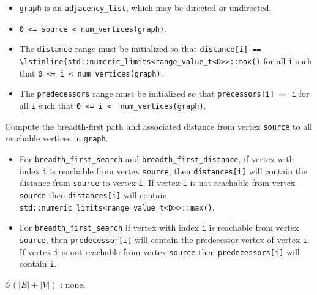 \begin{itemdescr}
      \pnum\preconditions
      \begin{itemize}
            \item
                  \lstinline{graph} is an \lstinline{adjacency_list}, which may be directed or
                  undirected.
            \item
                  \lstinline{0 <= source < num_vertices(graph)}.

            \item
                  The \lstinline{distance} range must be initialized so that
                  \lstinline{distance[i] == \lstinline{std::numeric_limits<range_value_t<D>>::max()}
                  for all \lstinline{i}
                  such that \lstinline{0 <= i < num_vertices(graph)}.  
            \item
                  The \lstinline{predecessors} range must be initialized so that
                  \lstinline{precessors[i] == i} for all \lstinline{i} such that
                  \lstinline{0 <= i <  num_vertices(graph)}.
      \end{itemize}
      \pnum\effects Compute the breadth-first path and associated distance from vertex
      \lstinline{source} to all reachable vertices in \lstinline{graph}.
      \pnum\returns
      \begin{itemize}
            \item For \lstinline{breadth_first_search} and \lstinline{breadth_first_distance},
                  if vertex with index \lstinline{i} is reachable from vertex \lstinline{source}, then
                  \lstinline{distances[i]} will contain the distance from \lstinline{source} to vertex
                  \lstinline{i}.  If vertex \lstinline{i} is not reachable from vertex
                  \lstinline{source} then \lstinline{distances[i]} will contain
                  \lstinline{std::numeric_limits<range_value_t<D>>::max()}.
            \item
                  For \lstinline{breadth_first_search} if vertex with index \lstinline{i} is reachable
                  from vertex \lstinline{source}, then \lstinline{predecessor[i]} will contain the
                  predecessor vertex of vertex \lstinline{i}.  If vertex \lstinline{i} is not reachable
                  from vertex \lstinline{source} then \lstinline{predecessors[i]} will contain
                  \lstinline{i}.
      \end{itemize}
      \pnum\complexity $\mathcal{O}(|E| + |V|)$
      \pnum\throws: none. 
\end{itemdescr}


